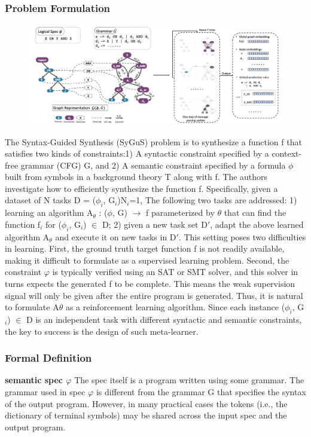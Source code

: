 \documentclass{article}
\begin{document}
\subsubsection{Problem Formulation}
\begin{figure}[ht]
\vskip 0.2in
\begin{center}
\centerline{\includegraphics[width=\columnwidth]{Images/Synthesis1-1.png}}
\label{icml-historical}
\end{center}
\vskip -0.2in
\end{figure}
The Syntax-Guided Synthesis (SyGuS) problem is to synthesize a function f that satisfies two kinds of constraints:1) A syntactic constraint specified by a context-free grammar (CFG) G, and 2) A semantic constraint specified by a formula $\phi$ built from symbols in a background theory T along with f. The authors investigate how to efficiently synthesize the function f. Specifically, given a dataset of N tasks D = {($\phi_i$, G$_i$)}N$_i$=1, The following two tasks are addressed: 1) learning an algorithm A$_\theta$ : ($\phi$, G) $\rightarrow$ f parameterized by $\theta$ that can find the function f$_i$ for ($\phi_i$, G$_i$) $\in$ D; 2) given a new task set D$'$, adapt the above learned algorithm A$_\theta$ and execute it on new tasks in D$'$. This setting poses two difficulties in learning. First, the ground truth target function f is not readily available, making it difficult to formulate as a supervised learning problem. Second, the constraint $\varphi$ is typically verified using an SAT or SMT solver, and this solver in turns expects the generated f to be complete. This means the weak supervision signal will only be given after the entire program is generated. Thus, it is natural to formulate A$\theta$ as a reinforcement learning algorithm. Since each instance ($\phi_i$, G$_i$) $\in$ D is an independent task with different syntactic and semantic constraints, the key to success is the design of such meta-learner.
\subsubsection{Formal Definition}
\textbf{semantic spec $\varphi$} The spec itself is a program written using some grammar. The grammar used in spec $\varphi$ is different from the grammar G that specifies the syntax of the output program. However, in many practical cases the tokens (i.e., the dictionary of terminal symbols) may be shared across the input spec and the output program.
\end{document}
